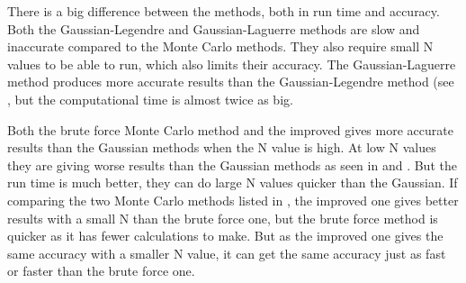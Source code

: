 There is a big difference between the methods, both in run time and accuracy. Both the Gaussian-Legendre and Gaussian-Laguerre methods are slow and inaccurate compared to the Monte Carlo methods. They also require small N values to be able to run, which also limits their accuracy. The Gaussian-Laguerre method produces more accurate results than the Gaussian-Legendre method (see , but the computational time is almost twice as big. 

Both the brute force Monte Carlo method and the improved gives more accurate results than the Gaussian methods when the N value is high. At low N values they are giving worse results than the Gaussian methods as seen in  and . But the run time is much better, they can do large N values quicker than the Gaussian.  If comparing the two Monte Carlo methods listed in , the improved one gives better results with a small N than the brute force one, but the brute force method is quicker as it has fewer calculations to make. But as the improved one gives the same accuracy with a smaller N value, it can get the same accuracy just as fast or faster than the brute force one. 